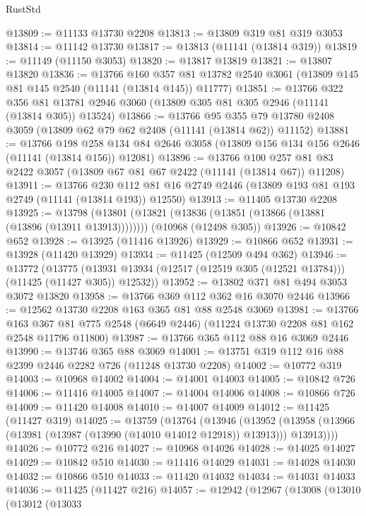 \begin{lexlean}{RustStd}
\begin{coremodule}
@13809 := @11133 @13730 @2208
@13813 := @13809 @319 @81 @319 @3053
@13814 := @11142 @13730
@13817 := @13813 (@11141 (@13814 @319))
@13819 := @11149 (@11150 @3053)
@13820 := @13817 @13819
@13821 := @13807 @13820
@13836 := @13766
    @160
    @357
    @81
    @13782
    @2540
    @3061
    (@13809 @145 @81 @145 @2540 (@11141 (@13814 @145)) @11777)
@13851 := @13766
    @322
    @356
    @81
    @13781
    @2946
    @3060
    (@13809 @305 @81 @305 @2946 (@11141 (@13814 @305)) @13524)
@13866 := @13766
    @95
    @355
    @79
    @13780
    @2408
    @3059
    (@13809 @62 @79 @62 @2408 (@11141 (@13814 @62)) @11152)
@13881 := @13766
    @198
    @258
    @134
    @84
    @2646
    @3058
    (@13809 @156 @134 @156 @2646 (@11141 (@13814 @156)) @12081)
@13896 := @13766
    @100
    @257
    @81
    @83
    @2422
    @3057
    (@13809 @67 @81 @67 @2422 (@11141 (@13814 @67)) @11208)
@13911 := @13766
    @230
    @112
    @81
    @16
    @2749
    @2446
    (@13809 @193 @81 @193 @2749 (@11141 (@13814 @193)) @12550)
@13913 := @11405 @13730 @2208
@13925 := @13798
    (@13801 (@13821 (@13836 (@13851 (@13866 (@13881 (@13896 (@13911 @13913))))))))
    (@10968 (@12498 @305))
@13926 := @10842 @652
@13928 := @13925 (@11416 @13926)
@13929 := @10866 @652
@13931 := @13928 (@11420 @13929)
@13934 := @11425 (@12509 @494 @362)
@13946 := @13772
    (@13775 (@13931 @13934 (@12517 (@12519 @305 (@12521 @13784))) (@11425 (@11427 @305)) @12532))
@13952 := @13802 @371 @81 @494 @3053 @3072 @13820
@13958 := @13766 @369 @112 @362 @16 @3070 @2446
@13966 := @12562 @13730 @2208 @163 @365 @81 @88 @2548 @3069
@13981 := @13766
    @163
    @367
    @81
    @775
    @2548
    (@6649 @2446)
    (@11224 @13730 @2208 @81 @162 @2548 @11796 @11800)
@13987 := @13766 @365 @112 @88 @16 @3069 @2446
@13990 := @13746 @365 @88 @3069
@14001 := @13751 @319 @112 @16 @88 @2399 @2446 @2282 @726 (@11248 @13730 @2208)
@14002 := @10772 @319
@14003 := @10968 @14002
@14004 := @14001 @14003
@14005 := @10842 @726
@14006 := @11416 @14005
@14007 := @14004 @14006
@14008 := @10866 @726
@14009 := @11420 @14008
@14010 := @14007 @14009
@14012 := @11425 (@11427 @319)
@14025 := @13759
    (@13764
      (@13946
        (@13952 (@13958 (@13966 (@13981 (@13987 (@13990 (@14010 @14012 @12918)) @13913))) @13913))))
@14026 := @10772 @216
@14027 := @10968 @14026
@14028 := @14025 @14027
@14029 := @10842 @510
@14030 := @11416 @14029
@14031 := @14028 @14030
@14032 := @10866 @510
@14033 := @11420 @14032
@14034 := @14031 @14033
@14036 := @11425 (@11427 @216)
@14057 := @12942
    (@12967
      (@13008
        (@13010
          (@13012
            (@13033

\end{coremodule}
\end{lexlean}
